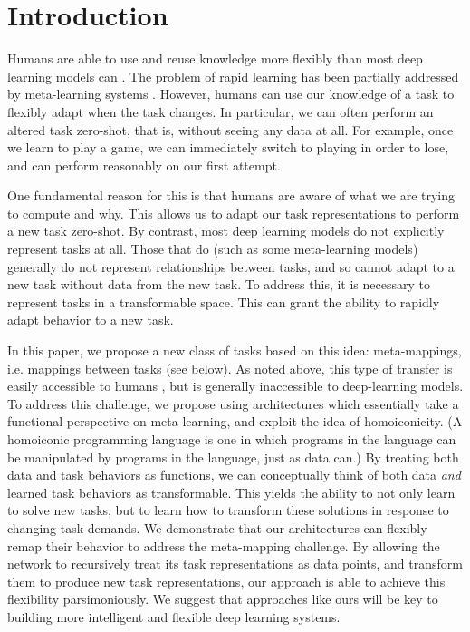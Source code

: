 \documentclass{article}
\begin{document}
\section{Introduction}
Humans are able to use and reuse knowledge more flexibly than most deep learning models can \citep{Lake2016, Marcus2018}. The problem of rapid learning has been partially addressed by meta-learning systems \citep[see also section \ref{sec_discussion}]{Santoro2016, Finn2017a, Finn2018, Stadie2018, Botvinick2019}. However, humans can use our knowledge of a task to flexibly adapt when the task changes. In particular, we can often perform an altered task zero-shot, that is, without seeing any data at all. For example, once we learn to play a game, we can immediately switch to playing in order to lose, and can perform reasonably on our first attempt. \par
One fundamental reason for this is that humans are aware of what we are trying to compute and why. This allows us to adapt our task representations to perform a new task zero-shot. By contrast, most deep learning models do not explicitly represent tasks at all. Those that do (such as some meta-learning models) generally do not represent relationships between tasks, and so cannot adapt to a new task without data from the new task. To address this, it is necessary to represent tasks in a transformable space. This can grant the ability to rapidly adapt behavior to a new task. \par
In this paper, we propose a new class of tasks based on this idea: meta-mappings, i.e. mappings between tasks (see below). As noted above, this type of transfer is easily accessible to humans \citep{Lake2016}, but is generally inaccessible to deep-learning models. To address this challenge, we propose using architectures which essentially take a functional perspective on meta-learning, and exploit the idea of homoiconicity. (A homoiconic programming language is one in which programs in the language can be manipulated by programs in the language, just as data can.) By treating both data and task behaviors as functions, we can conceptually think of both data \emph{and} learned task behaviors as transformable. This yields the ability to not only learn to solve new tasks, but to learn how to transform these solutions in response to changing task demands. We demonstrate that our architectures can flexibly remap their behavior to address the meta-mapping challenge. By allowing the network to recursively treat its task representations as data points, and transform them to produce new task representations, our approach is able to achieve this flexibility parsimoniously. We suggest that approaches like ours will be key to building more intelligent and flexible deep learning systems. \par
\end{document}
